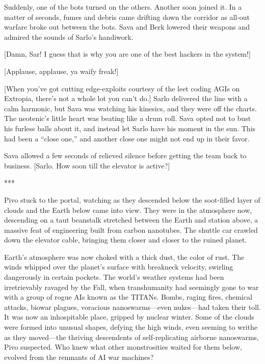 Suddenly, one of the bots turned on the others.  Another soon joined
it. In a matter of seconds, fumes and debris came drifting down the
corridor as all-out warfare broke out between the bots. Sava and Berk
lowered their weapons and admired the sounds of Sarlo's handiwork.

[Damn, Sar! I guess that is why you are one of the best hackers in the
system!]

[Applause, applause, ya waify freak!]

[When you've got cutting edge-exploits courtesy of the leet coding
AGIs on Extropia, there's not a whole lot you can't do.] Sarlo
delivered the line with a calm harmonic, but Sava was watching his
kinesics, and they were off the charts. The neotenic's little heart
was beating like a drum roll. Sava opted not to bust his furless balls
about it, and instead let Sarlo have his moment in the sun. This had
been a ``close one,'' and another close one might not end up in their
favor.

Sava allowed a few seconds of relieved silence before getting the team
back to business. [Sarlo. How soon till the elevator is active?]

\begin{center}
  ***
\end{center}

Pivo stuck to the portal, watching as they descended below the
soot-filled layer of clouds and the Earth below came into view. They
were in the atmosphere now, descending on a taut beanstalk stretched
between the Earth and station above, a massive feat of engineering
built from carbon nanotubes. The shuttle car crawled down the elevator
cable, bringing them closer and closer to the ruined planet.

Earth's atmosphere was now choked with a thick dust, the color of
rust. The winds whipped over the planet's surface with breakneck
velocity, swirling dangerously in certain pockets. The world's weather
systems had been irretrievably ravaged by the Fall, when transhumanity
had seemingly gone to war with a group of rogue AIs known as the
TITANs. Bombs, raging fires, chemical attacks, biowar plagues,
voracious nanoswarms—even nukes—had taken their toll.  It was now an
inhospitable place, gripped by nuclear winter. Some of the clouds were
formed into unusual shapes, defying the high winds, even seeming to
writhe as they moved—the thriving descendents of self-replicating
airborne nanoswarms, Pivo suspected. Who knew what other monstrosities
waited for them below, evolved from the remnants of AI war machines?

